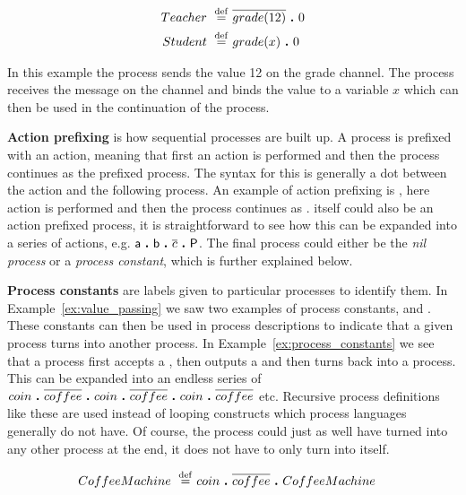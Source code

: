 	\begin{Exa}\label{ex:value_passing}
	\begin{align*}
			Teacher \ \stackrel{\mathrm{def}}{=}\  & \overline{grade(12)} \ \textbf{.}\  0 \\
			Student \ \stackrel{\mathrm{def}}{=}\  & grade(x) \ \textbf{.}\  0 
	\end{align*}	
	\end{Exa}

	In this example the  process sends the value 12 on the 
	\textsf{grade} channel. The  process receives the message on 
	the channel and binds the value to a variable $x$ which can then be used in 
	the continuation of the process.
	
	\textbf{Action prefixing} is how sequential processes are built up. A process 
	is prefixed with an action, meaning that first an action is performed and 
	then the process continues as the prefixed process. The syntax for this is 
	generally a dot between the action and the following process. An example of 
	action prefixing is  \ccsdot {}, here action  is 
	performed and then the process continues as .  itself could 
	also be an action prefixed process, it is straightforward to see how this can 
	be expanded into a series of actions, e.g. 
	$\textsf{a} \ \textbf{.}\  \textsf{b} \ \textbf{.}\  \overline{c} \ \textbf{.}\  \textsf{P}$. The final 
	process  could either be the \textit{nil process} or a 
	\textit{process constant}, which is further explained below.

	\textbf{Process constants} are labels given to particular processes to 
	identify them. In Example~\ref{ex:value_passing} we saw two examples of 
	process constants,  and . These constants can 
	then be used in process descriptions to indicate that a given process turns 
	into another process. In Example~\ref{ex:process_constants} we see that a 
	 process first accepts a , then outputs a 
	 and then turns back into a  process. This 
	can be expanded into an endless series of 
	$coin \ \textbf{.}\  \overline{coffee} \ \textbf{.}\  coin \ \textbf{.}\  \overline{coffee} \ \textbf{.}\  coin \ \textbf{.}\  \overline{coffee}$ 
	etc. Recursive process definitions like these are used instead of looping 
	constructs which process languages generally do not have.  Of course, the 
	 process could just as well have turned into any other 
	process at the end, it does not have to only turn into itself.
	
	\begin{Exa}\label{ex:process_constants}
	\begin{align*}
			CoffeeMachine \ \stackrel{\mathrm{def}}{=}\  & coin \ \textbf{.}\  \overline{coffee} \ \textbf{.}\  CoffeeMachine 
	\end{align*}	
	\end{Exa}


